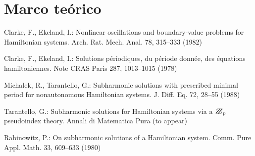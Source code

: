 \documentclass{llncs}
\begin{document}
%
\section{Marco teórico}
%

%
\begin{thebibliography}{5}
%
Clarke, F., Ekeland, I.:
Nonlinear oscillations and
boundary-value problems for Hamiltonian systems.
Arch. Rat. Mech. Anal. 78, 315--333 (1982)

Clarke, F., Ekeland, I.:
Solutions p\'{e}riodiques, du
p\'{e}riode donn\'{e}e, des \'{e}quations hamiltoniennes.
Note CRAS Paris 287, 1013--1015 (1978)

Michalek, R., Tarantello, G.:
Subharmonic solutions with prescribed minimal
period for nonautonomous Hamiltonian systems.
J. Diff. Eq. 72, 28--55 (1988)

Tarantello, G.:
Subharmonic solutions for Hamiltonian
systems via a $\bbbz_{p}$ pseudoindex theory.
Annali di Matematica Pura (to appear)

Rabinowitz, P.:
On subharmonic solutions of a Hamiltonian system.
Comm. Pure Appl. Math. 33, 609--633 (1980)

\end{thebibliography}
\end{document}
